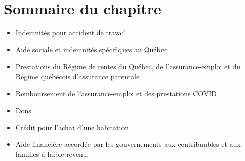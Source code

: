 \section{Sommaire du chapitre}
\begin{itemize}[label=]
	\item Indemnités pour accident de travail
	\item Aide sociale et indemnités spécifiques au Québec
	\item Prestations du Régime de rentes du Québec, de l'assurance-emploi et du Régime québécois d'assurance parentale
	\item Remboursement de l'assurance-emploi et des prestations COVID
	\item Dons
	\item Crédit pour l'achat d'une habitation
	\item Aide financière accordée par les gouvernements aux contribuables et aux familles à faible revenu.
\end{itemize}
